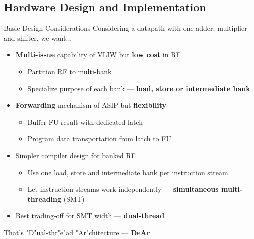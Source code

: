 \documentclass{beamer}
\begin{document}
\begin{CJK}{UTF8}{bkai}
            \subsection{Hardware Design and Implementation}
            \begin{frame}{Basic Design Considerations}
                \pause
                Considering a datapath with one adder, multiplier and shifter, we want... \\
                \begin{itemize}
                    \pause
                    \item \textbf{Multi-issue} capability of VLIW but \textbf{low cost} in RF
                        \begin{itemize}
                            \item Partition RF to multi-bank
                            \item Specialize purpose of each bank --- \textbf{load, store or intermediate bank}
                        \end{itemize}
                    \pause
                    \item \textbf{Forwarding} mechanism of ASIP but \textbf{flexibility}
                        \begin{itemize}
                            \item Buffer FU result with dedicated latch
                            \item Program data transportation from latch to FU
                        \end{itemize}
                    \pause
                    \item Simpler compiler design for banked RF
                        \begin{itemize}
                            \item Use one load, store and intermediate bank per instruction stream 
                            \item Let instruction streams work independently --- \textbf{simultaneous multi-threading} (SMT)
                        \end{itemize}
                    \pause
                    \item Best trading-off for SMT width --- \textbf{dual-thread}
                \end{itemize}
                \pause
                \begin{center}
                {\large{That's "D"ual-thr"e"ad "Ar"chitecture --- \textbf{DeAr}}}
                \end{center}
            \end{frame}


\end{CJK}
\end{document}
